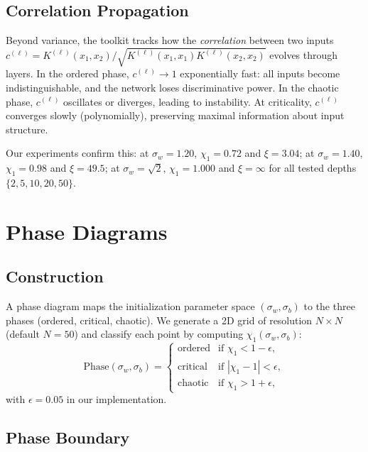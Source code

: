 \documentclass[10pt]{article}
\theoremstyle{definition}
\begin{document}
\subsection{Correlation Propagation}

Beyond variance, the toolkit tracks how the \emph{correlation} between two inputs $c^{(\ell)} = K^{(\ell)}(x_1, x_2)/\sqrt{K^{(\ell)}(x_1, x_1) K^{(\ell)}(x_2, x_2)}$ evolves through layers.
In the ordered phase, $c^{(\ell)} \to 1$ exponentially fast: all inputs become indistinguishable, and the network loses discriminative power.
In the chaotic phase, $c^{(\ell)}$ oscillates or diverges, leading to instability.
At criticality, $c^{(\ell)}$ converges slowly (polynomially), preserving maximal information about input structure.

Our experiments confirm this: at $\sigma_w = 1.20$, $\chi_1 = 0.72$ and $\xi = 3.04$; at $\sigma_w = 1.40$, $\chi_1 = 0.98$ and $\xi = 49.5$; at $\sigma_w = \sqrt{2}$, $\chi_1 = 1.000$ and $\xi = \infty$ for all tested depths $\{2, 5, 10, 20, 50\}$.

\section{Phase Diagrams}
\label{sec:phase}

\subsection{Construction}

A phase diagram maps the initialization parameter space $(\sigma_w, \sigma_b)$ to the three phases (ordered, critical, chaotic).
We generate a 2D grid of resolution $N \times N$ (default $N=50$) and classify each point by computing $\chi_1(\sigma_w, \sigma_b)$:
\begin{equation}
  \text{Phase}(\sigma_w, \sigma_b) = \begin{cases}
    \text{ordered}  & \text{if } \chi_1 < 1 - \epsilon, \\
    \text{critical} & \text{if } |\chi_1 - 1| < \epsilon, \\
    \text{chaotic}  & \text{if } \chi_1 > 1 + \epsilon,
  \end{cases}
\end{equation}
with $\epsilon = 0.05$ in our implementation.

\subsection{Phase Boundary}
\end{document}

